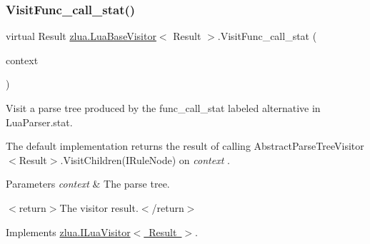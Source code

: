 \mbox{\label{classzlua_1_1_lua_base_visitor_ae4969a8795b22c20db3d5f1339484c47}} 
\subsubsection{\texorpdfstring{Visit\+Func\+\_\+call\+\_\+stat()}{VisitFunc\_call\_stat()}}
{\footnotesize\ttfamily virtual Result \mbox{\hyperlink{classzlua_1_1_lua_base_visitor}{zlua.\+Lua\+Base\+Visitor}}$<$ Result $>$.Visit\+Func\+\_\+call\+\_\+stat (\begin{DoxyParamCaption}\item[{\mbox{[}\+Not\+Null\mbox{]} \mbox{\hyperlink{classzlua_1_1_lua_parser_1_1_func__call__stat_context}{Lua\+Parser.\+Func\+\_\+call\+\_\+stat\+Context}}}]{context }\end{DoxyParamCaption})\hspace{0.3cm}{\ttfamily [virtual]}}



Visit a parse tree produced by the {\ttfamily func\+\_\+call\+\_\+stat} labeled alternative in Lua\+Parser.\+stat. 

The default implementation returns the result of calling Abstract\+Parse\+Tree\+Visitor$<$\+Result$>$.\+Visit\+Children(\+I\+Rule\+Node) on {\itshape context} . 


\begin{DoxyParams}{Parameters}
{\em context} & The parse tree.\\
\hline
\end{DoxyParams}
$<$return$>$The visitor result.$<$/return$>$ 

Implements \mbox{\hyperlink{interfacezlua_1_1_i_lua_visitor_a3e00a13013b406b034c47f9dd4bc63d5}{zlua.\+I\+Lua\+Visitor$<$ Result $>$}}.

\mbox{\label{classzlua_1_1_lua_base_visitor_adfce03f603d9109a1cac5ff92c9b8642}} 
